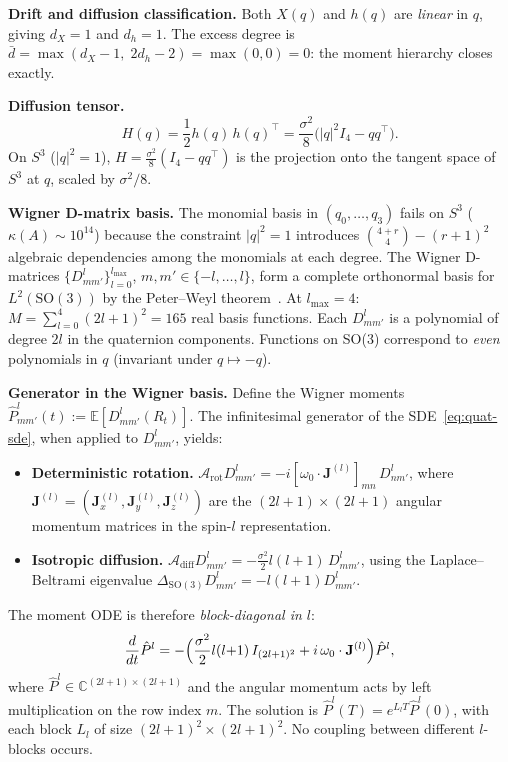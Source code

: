 \documentclass{article}
\newcommand{\E}{\mathbb{E}}
\theoremstyle{definition}
\begin{document}
\textbf{Drift and diffusion classification.}
Both $X(q)$ and $h(q)$ are \emph{linear} in $q$, giving
$d_X = 1$ and $d_h = 1$.  The excess degree is
$\bar{d} = \max(d_X - 1,\; 2d_h - 2) = \max(0, 0) = 0$:
the moment hierarchy closes exactly.

\textbf{Diffusion tensor.}
\begin{equation}
    H(q) = \frac{1}{2}h(q)\,h(q)^\top
    = \frac{\sigma^2}{8}\bigl(|q|^2 I_4 - qq^\top\bigr).
\end{equation}
On $S^3$ ($|q|^2 = 1$), $H = \frac{\sigma^2}{8}(I_4 - qq^\top)$
is the projection onto the tangent space of $S^3$ at $q$,
scaled by $\sigma^2/8$.

\textbf{Wigner D-matrix basis.}
The monomial basis in $(q_0, \ldots, q_3)$
fails on $S^3$ ($\kappa(A) \sim 10^{14}$) because the constraint
$|q|^2 = 1$ introduces $\binom{4+r}{4} - (r+1)^2$ algebraic dependencies
among the monomials at each degree.
The Wigner D-matrices $\{D^l_{mm'}\}_{l=0}^{l_{\max}}$,
$m, m' \in \{-l, \ldots, l\}$,
form a complete orthonormal basis for $L^2(\mathrm{SO}(3))$
by the Peter--Weyl theorem~\cite{hall2015,chirikjian2012}.
At $l_{\max} = 4$: $M = \sum_{l=0}^4 (2l+1)^2 = 165$ real basis functions.
Each $D^l_{mm'}$ is a polynomial of degree $2l$ in the quaternion
components. Functions on SO(3) correspond to \emph{even} polynomials
in $q$ (invariant under $q \mapsto -q$).

\textbf{Generator in the Wigner basis.}
Define the Wigner moments
$\hat{P}^l_{mm'}(t) := \E[D^l_{mm'}(R_t)]$.
The infinitesimal generator of the SDE~\eqref{eq:quat-sde},
when applied to $D^l_{mm'}$, yields:
\begin{itemize}
    \item \textbf{Deterministic rotation.}
    $\mathcal{A}_{\mathrm{rot}} D^l_{mm'} = -i[\omega_0 \cdot \mathbf{J}^{(l)}]_{mn}\, D^l_{nm'}$,
    where $\mathbf{J}^{(l)} = (\mathbf{J}^{(l)}_x, \mathbf{J}^{(l)}_y, \mathbf{J}^{(l)}_z)$
    are the $(2l{+}1) \times (2l{+}1)$ angular momentum matrices in the spin-$l$ representation.
    \item \textbf{Isotropic diffusion.}
    $\mathcal{A}_{\mathrm{diff}} D^l_{mm'} = -\frac{\sigma^2}{2}l(l{+}1)\, D^l_{mm'}$,
    using the Laplace--Beltrami eigenvalue $\Delta_{\mathrm{SO}(3)} D^l_{mm'} = -l(l{+}1) D^l_{mm'}$.
\end{itemize}
The moment ODE is therefore \emph{block-diagonal in $l$}:
\begin{equation}\label{eq:wigner-ode}
    \frac{d}{dt}\hat{P}^l
    = -\Bigl(\frac{\sigma^2}{2}l(l{+}1)\, I_{(2l+1)^2}
    + i\, \omega_0 \cdot \mathbf{J}^{(l)}\Bigr)\hat{P}^l,
\end{equation}
where $\hat{P}^l \in \mathbb{C}^{(2l+1) \times (2l+1)}$
and the angular momentum acts by left multiplication
on the row index $m$.
The solution is $\hat{P}^l(T) = e^{L_l T}\hat{P}^l(0)$,
with each block $L_l$ of size $(2l{+}1)^2 \times (2l{+}1)^2$.
No coupling between different $l$-blocks occurs.
\end{document}
